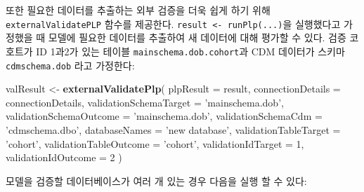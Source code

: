 \documentclass[10.5pt]{book}
\newenvironment{Shaded}{\begin{snugshade}}{\end{snugshade}}
\newcommand{\KeywordTok}[1]{\textcolor[rgb]{0.13,0.29,0.53}{\textbf{#1}}}
\newcommand{\DataTypeTok}[1]{\textcolor[rgb]{0.13,0.29,0.53}{#1}}
\newcommand{\DecValTok}[1]{\textcolor[rgb]{0.00,0.00,0.81}{#1}}
\newcommand{\StringTok}[1]{\textcolor[rgb]{0.31,0.60,0.02}{#1}}
\newcommand{\NormalTok}[1]{#1}
\theoremstyle{definition}
\theoremstyle{definition}
\theoremstyle{definition}
\theoremstyle{remark}
\begin{document}
또한 필요한 데이터를 추출하는 외부 검증을 더욱 쉽게 하기 위해
\texttt{externalValidatePLP} 함수를 제공한다.
\texttt{result\ \textless{}-\ runPlp(...)}을 실행했다고 가정했을 때
모델에 필요한 데이터를 추출하여 새 데이터에 대해 평가할 수 있다. 검증
코호트가 ID 1과2가 있는 테이블 \texttt{mainschema.dob.cohort}과 CDM
데이터가 스키마 \texttt{cdmschema.dob} 라고 가정한다:

\begin{Shaded}
\begin{Highlighting}[]
\NormalTok{valResult <-}\StringTok{ }\KeywordTok{externalValidatePlp}\NormalTok{(}
    \DataTypeTok{plpResult =}\NormalTok{ result,}
    \DataTypeTok{connectionDetails =}\NormalTok{ connectionDetails,}
    \DataTypeTok{validationSchemaTarget =} \StringTok{'mainschema.dob'}\NormalTok{,}
    \DataTypeTok{validationSchemaOutcome =} \StringTok{'mainschema.dob'}\NormalTok{,}
    \DataTypeTok{validationSchemaCdm =} \StringTok{'cdmschema.dbo'}\NormalTok{,}
    \DataTypeTok{databaseNames =} \StringTok{'new database'}\NormalTok{,}
    \DataTypeTok{validationTableTarget =} \StringTok{'cohort'}\NormalTok{,}
    \DataTypeTok{validationTableOutcome =} \StringTok{'cohort'}\NormalTok{,}
    \DataTypeTok{validationIdTarget =} \DecValTok{1}\NormalTok{,}
    \DataTypeTok{validationIdOutcome =} \DecValTok{2}
\NormalTok{)}
\end{Highlighting}
\end{Shaded}

모델을 검증할 데이터베이스가 여러 개 있는 경우 다음을 실행 할 수 있다:
\end{document}

